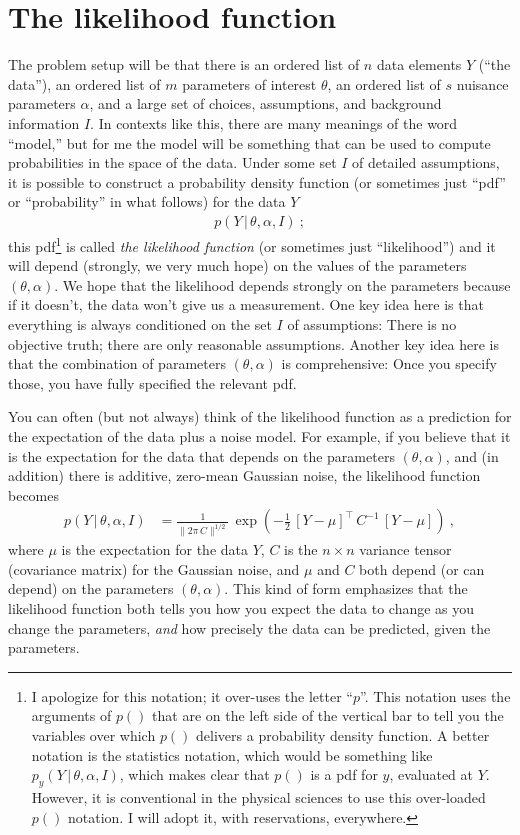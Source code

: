 \documentclass{article}
\newcommand{\given}{\,|\,}
\newcommand{\norm}[1]{\lVert{#1}\rVert}
\begin{document}
\section{The likelihood function}\label{sec:lf}
The problem setup will be that there is an ordered list of $n$ data elements $Y$ (``the data''), an ordered list of $m$ parameters of interest $\theta$, an ordered list of $s$ nuisance parameters $\alpha$, and a large set of choices, assumptions, and background information $I$.
In contexts like this, there are many meanings of the word ``model,'' but for me the model will be something that can be used to compute probabilities in the space of the data.
Under some set $I$ of detailed assumptions, it is possible to construct a probability density function (or sometimes just ``pdf'' or ``probability'' in what follows) for the data $Y$
\begin{align}
    p(Y\given\theta,\alpha,I) ~;
\end{align}
this pdf\footnote{%
I apologize for this notation; it over-uses the letter ``$p$''.
This notation uses the arguments of $p()$ that are on the left side of the vertical bar to tell you the variables over which $p()$ delivers a probability density function.
A better notation is the statistics notation, which would be something like $p_y(Y\given\theta,\alpha,I)$, which makes clear that $p()$ is a pdf for $y$, evaluated at $Y$.
However, it is conventional in the physical sciences to use this over-loaded $p()$ notation.
I will adopt it, with reservations, everywhere.}
is called \emph{the likelihood function} (or sometimes just ``likelihood'') and it will depend (strongly, we very much hope) on the values of the parameters $(\theta, \alpha)$.
We hope that the likelihood depends strongly on the parameters because if it doesn't, the data won't give us a measurement.
One key idea here is that everything is always conditioned on the set $I$ of assumptions: There is no objective truth; there are only reasonable assumptions.
Another key idea here is that the combination of parameters $(\theta,\alpha)$ is comprehensive: Once you specify those, you have fully specified the relevant pdf.

You can often (but not always) think of the likelihood function as a prediction for the expectation of the data plus a noise model.
For example, if you believe that it is the expectation for the data that depends on the parameters $(\theta, \alpha)$, and (in addition) there is additive, zero-mean Gaussian noise, the likelihood function becomes
\begin{align}
    p(Y\given\theta,\alpha,I) &= \frac{1}{\norm{2\pi\,C}^{1/2}}\,\exp\left(-\frac{1}{2}\,[Y - \mu]^\top\,C^{-1}\,[Y - \mu]\right) ~,
\end{align}
where $\mu$ is the expectation for the data $Y$,
$C$ is the $n\times n$ variance tensor (covariance matrix) for the Gaussian noise,
and $\mu$ and $C$ both depend (or can depend) on the parameters $(\theta,\alpha)$.
This kind of form emphasizes that the likelihood function both tells you how you expect the data to change as you change the parameters, \emph{and} how precisely the data can be predicted, given the parameters.
\end{document}
